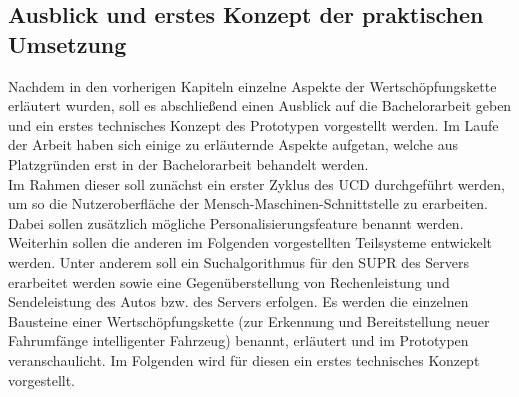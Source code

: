 \subsection{Ausblick  und erstes Konzept der praktischen Umsetzung}\label{technGrundkonzept}
Nachdem in den vorherigen Kapiteln einzelne Aspekte der Wertschöpfungskette erläutert wurden, soll es abschließend einen Ausblick auf die Bachelorarbeit geben und ein erstes technisches Konzept des Prototypen vorgestellt werden. Im Laufe der Arbeit haben sich einige zu erläuternde Aspekte aufgetan, welche aus Platzgründen erst in der Bachelorarbeit behandelt werden.\\

Im Rahmen dieser soll zunächst ein erster Zyklus des UCD durchgeführt werden, um so die Nutzeroberfläche der Mensch-Maschinen-Schnittstelle zu erarbeiten. Dabei sollen zusätzlich mögliche Personalisierungsfeature benannt werden. Weiterhin sollen die anderen im Folgenden vorgestellten Teilsysteme entwickelt werden. Unter anderem soll ein Suchalgorithmus für den SUPR des Servers erarbeitet werden sowie eine Gegenüberstellung von Rechenleistung und Sendeleistung des Autos bzw. des Servers erfolgen. Es werden die einzelnen Bausteine einer Wertschöpfungskette (zur Erkennung
und Bereitstellung neuer Fahrumfänge intelligenter Fahrzeug) benannt, erläutert und im Prototypen veranschaulicht. Im Folgenden wird für diesen ein erstes technisches Konzept vorgestellt.\\


